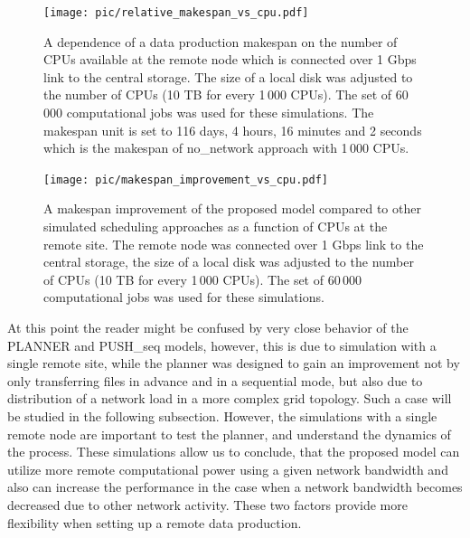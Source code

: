 \documentclass{svjour3}                     %
\begin{document}
\begin{figure}
\centering
\begin{minipage}{1\textwidth}
\centering
    \texttt{[image: pic/relative\_makespan\_vs\_cpu.pdf]}
    \caption{A dependence of a data production makespan on the number of CPUs available at the remote node which is connected over 1 Gbps link to the central storage. The size of a local disk was adjusted to the number of CPUs (10 TB for every 1\,000 CPUs). The set of 60\,000 computational jobs was used for these simulations. The makespan unit is set to 116 days, 4 hours, 16 minutes and 2 seconds which is the makespan of no\_network approach with 1\,000 CPUs.}
    \label{relative_makespan_vs_cpu}
\end{minipage}\hspace{3mm}%

\begin{minipage}{1\textwidth}
\centering
    \texttt{[image: pic/makespan\_improvement\_vs\_cpu.pdf]}
    \caption{A makespan improvement of the proposed model compared to other simulated scheduling approaches as a function of CPUs at the remote site. The remote node was connected over 1 Gbps link to the central storage, the size of a local disk was adjusted to the number of CPUs (10 TB for every 1\,000 CPUs). The set of 60\,000 computational jobs was used for these simulations.}
    \label{makespan_improvement_vs_cpu}
\end{minipage} 
\end{figure}

At this point the reader might be confused by very close behavior of the PLANNER and PUSH\_seq models, however, this is due to simulation with a single remote site, while the planner was designed to gain an improvement not by only  transferring files in advance and in a sequential mode, but also due to distribution of a network load in a more complex grid topology. Such a case will be studied in the following subsection. However, the simulations with a single remote node are important to test the planner, and understand the dynamics of the process. These simulations allow us to conclude, that the proposed model can utilize more remote computational power using a given network bandwidth and also can increase the performance in the case when a network bandwidth becomes decreased due to other network activity. These two factors provide more flexibility when setting up a remote data production.
\end{document}
